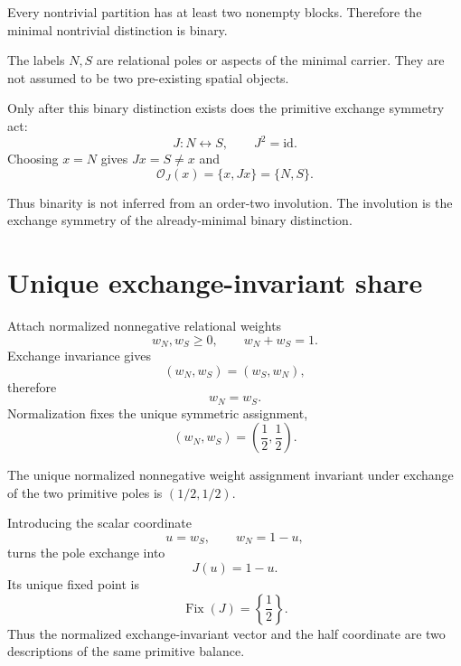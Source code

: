 \begin{theorem}
Every nontrivial partition has at least two nonempty blocks. Therefore the minimal nontrivial distinction is binary.
\end{theorem}

The labels $N,S$ are relational poles or aspects of the minimal carrier. They are not assumed to be two pre-existing spatial objects.

Only after this binary distinction exists does the primitive exchange symmetry act:
\begin{equation}
\boxed{
J:N\leftrightarrow S,
\qquad
J^2=\mathrm{id}.
}
\label{eq:v12_primitive_involution}
\end{equation}
Choosing $x=N$ gives $Jx=S\neq x$ and
\begin{equation}
\boxed{
\mathcal O_J(x)=\{x,Jx\}=\{N,S\}.
}
\label{eq:v12_primitive_binary_orbit}
\end{equation}

Thus binarity is not inferred from an order-two involution. The involution is the exchange symmetry of the already-minimal binary distinction.

\section{Unique exchange-invariant share}

Attach normalized nonnegative relational weights
\begin{equation}
w_N,w_S\ge0,
\qquad
w_N+w_S=1.
\end{equation}
Exchange invariance gives
\begin{equation}
(w_N,w_S)=(w_S,w_N),
\end{equation}
therefore
\begin{equation}
w_N=w_S.
\end{equation}
Normalization fixes the unique symmetric assignment,
\begin{equation}
\boxed{
(w_N,w_S)=\left(\frac12,\frac12\right).
}
\label{eq:v12_unique_half_share}
\end{equation}

\begin{theorem}
The unique normalized nonnegative weight assignment invariant under exchange of the two primitive poles is $(1/2,1/2)$.
\end{theorem}

Introducing the scalar coordinate
\[
u=w_S,
\qquad
w_N=1-u,
\]
turns the pole exchange into
\begin{equation}
J(u)=1-u.
\end{equation}
Its unique fixed point is
\begin{equation}
\boxed{\operatorname{Fix}(J)=\left\{\frac12\right\}.}
\label{eq:v12_half_fixed_point}
\end{equation}
Thus the normalized exchange-invariant vector and the half coordinate are two descriptions of the same primitive balance.

